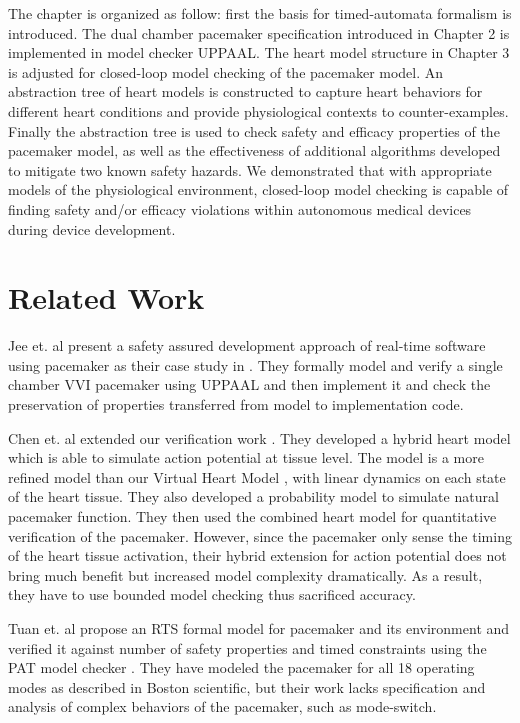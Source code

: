 The chapter is organized as follow: first the basis for timed-automata formalism is introduced.
The dual chamber pacemaker specification introduced in Chapter 2 is implemented in model checker UPPAAL.
The heart model structure in Chapter 3 is adjusted for closed-loop model checking of the pacemaker model.
An abstraction tree of heart models is constructed to capture heart behaviors for different heart conditions and provide physiological contexts to counter-examples.
Finally the abstraction tree is used to check safety and efficacy properties of the pacemaker model, as well as the effectiveness of additional algorithms developed to mitigate two known safety hazards. 
We demonstrated that with appropriate models of the physiological environment, closed-loop model checking is capable of finding safety and/or efficacy violations within autonomous medical devices during device development.

\section{Related Work}
Jee et. al present a safety assured development approach of real-time software using pacemaker as their case study in \cite{Jee}. They formally model and verify a single chamber VVI pacemaker using UPPAAL and then implement it and check the preservation of properties transferred from model to implementation code. 

Chen et. al \cite{Marta} extended our verification work \cite{TACAS12}. They developed a hybrid heart model which is able to simulate action potential at tissue level. The model is a more refined model than our Virtual Heart Model \cite{VHM_proc}, with linear dynamics on each state of the heart tissue. They also developed a probability model to simulate natural pacemaker function. They then used the combined heart model for quantitative verification of the pacemaker. However, since the pacemaker only sense the timing of the heart tissue activation, their hybrid extension for action potential does not bring much benefit but increased model complexity dramatically. As a result, they have to use bounded model checking thus sacrificed accuracy.

Tuan et. al propose an RTS formal model for pacemaker and its environment and verified it against number of safety properties and timed constraints using the PAT model checker \cite{Tuan}. They have modeled the pacemaker for all 18 operating modes as described in Boston scientific, but their work lacks specification and analysis of complex behaviors of the pacemaker, such as mode-switch.

